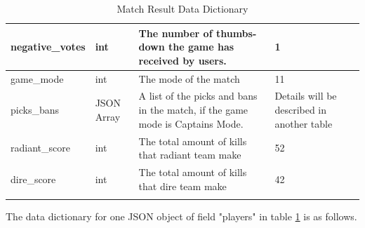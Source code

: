 \documentclass{article}
\begin{document}
\begin{longtable}{|p{2.5cm}|p{2cm}|p{5.5cm}|p{3cm}|}
\hline
negative\_votes  & int  & The number of thumbs-down the game has received by users.  & 1 \\
\hline
game\_mode  & int  & The mode of the match  & 11 \\
\hline
picks\_bans  & JSON Array  & A list of the picks and bans in the match, if the game mode is Captains Mode.  & Details will be described in another table \\
\hline
radiant\_score  & int  & The total amount of kills that radiant team make  & 52 \\
\hline
dire\_score  & int  & The total amount of kills that dire team make  & 42 \\
\hline
\caption{Match Result Data Dictionary}
\label{match-result-data-dictionary}
\end{longtable}


The data dictionary for one JSON object of field "players" in table \ref{match-result-data-dictionary} is as follows.
\end{document}

